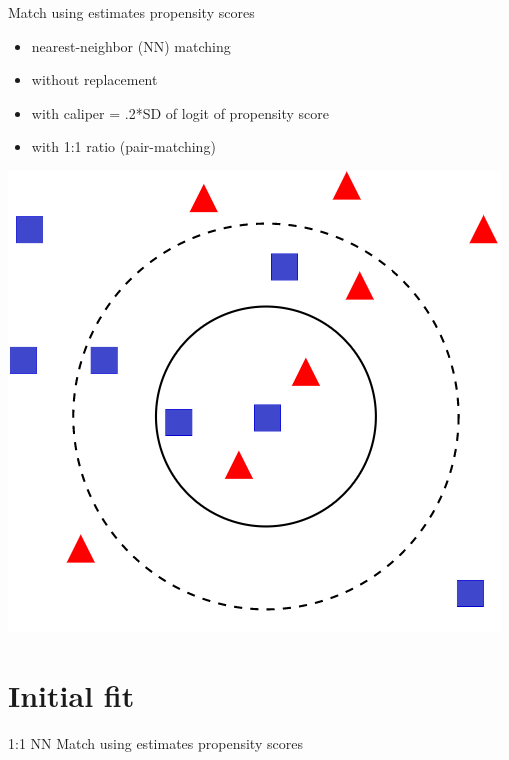 \documentclass[
]{book}
\newenvironment{Shaded}{\begin{snugshade}}{\end{snugshade}}
\newcommand{\AttributeTok}[1]{\textcolor[rgb]{0.77,0.63,0.00}{#1}}
\newcommand{\ConstantTok}[1]{\textcolor[rgb]{0.00,0.00,0.00}{#1}}
\newcommand{\DecValTok}[1]{\textcolor[rgb]{0.00,0.00,0.81}{#1}}
\newcommand{\FunctionTok}[1]{\textcolor[rgb]{0.00,0.00,0.00}{#1}}
\newcommand{\NormalTok}[1]{#1}
\newcommand{\OtherTok}[1]{\textcolor[rgb]{0.56,0.35,0.01}{#1}}
\newcommand{\SpecialCharTok}[1]{\textcolor[rgb]{0.00,0.00,0.00}{#1}}
\newcommand{\StringTok}[1]{\textcolor[rgb]{0.31,0.60,0.02}{#1}}
\providecommand{\tightlist}{%
  \setlength{\itemsep}{0pt}\setlength{\parskip}{0pt}}
\begin{document}
Match using estimates propensity scores

\begin{itemize}
\tightlist
\item
  nearest-neighbor (NN) matching
\item
  without replacement
\item
  with caliper = .2*SD of logit of propensity score
\item
  with 1:1 ratio (pair-matching)
\end{itemize}

\includegraphics[width=0.5\linewidth]{images/nn}

\hypertarget{initial-fit}{%
\section{Initial fit}\label{initial-fit}}

1:1 NN Match using estimates propensity scores

\begin{Shaded}
\end{Shaded}
\end{document}
